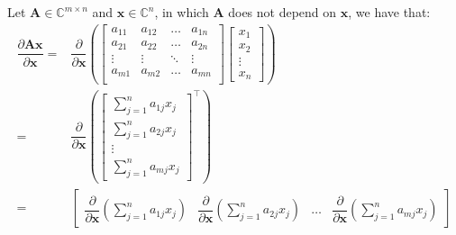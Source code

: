 \documentclass{article}
\newcommand{\trans}{\top}
\begin{document}
Let \(\mathbf{A}\in \mathbb{C}^{m\times n}\) and \(\mathbf{x} \in \mathbb{C}^{n}\), in which \(\mathbf{A}\) does not depend on \(\mathbf{x}\), we have that:
\begin{align}
    \dfrac{\partial \mathbf{A} \mathbf{x}}{\partial \mathbf{x}} = & \dfrac{\partial}{\partial \mathbf{x}} \left(
        \begin{bmatrix}
            a_{11} & a_{12} & \dots & a_{1n} \\
            a_{21} & a_{22} & \dots & a_{2n} \\
            \vdots & \vdots & \ddots & \vdots \\
            a_{m1} & a_{m2} & \dots & a_{mn} \\
        \end{bmatrix} \begin{bmatrix}
            x_{1} \\ x_{2} \\ \vdots \\ x_{n}
        \end{bmatrix} \right)  \\
    = & \dfrac{\partial}{\partial \mathbf{x}} \left(\begin{bmatrix} 
        \sum_{j = 1}^n a_{1j}x_j \\
        \sum_{j = 1}^n a_{2j}x_j \\
        \vdots \\
        \sum_{j = 1}^n a_{mj}x_j
    \end{bmatrix}^\trans \right)  \\
    = & \begin{bmatrix}
        \dfrac{\partial}{\partial \mathbf{x}}\left(\sum_{j = 1}^n {a_{1j}x_j}\right) & \dfrac{\partial}{\partial \mathbf{x}}\left(\sum_{j = 1}^n {a_{2j}x_j}\right) & \dots & \dfrac{\partial}{\partial \mathbf{x}}\left(\sum_{j = 1}^n {a_{mj}x_j}\right)
    \end{bmatrix}
\end{align}
\end{document}
